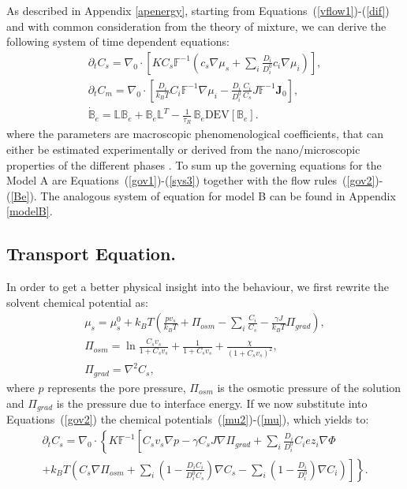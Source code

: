 \documentclass[runningheads]{llncs}
\newcommand{\F}{\ensuremath{\mathbb{F}}}
\newcommand{\LL}{\ensuremath{\mathbb{L}}}
\begin{document}
As described in Appendix \ref{apenergy}, starting from Equations~(\ref{vflow1})-(\ref{dif}) and with common consideration from the theory of mixture, we can derive the following system of time dependent equations:
\begin{eqnarray}
\partial_t C_s=\nabla_0 \cdot\left[K C_s \F^{-1}\left(c_s\nabla \mu_s +\sum_i \frac{D_i}{D^0_i} c_i \nabla \mu_i\right)\right],\label{gov2}\\
\partial_t C_m= \nabla_0\cdot\left[\frac{D_i}{k_B T}C_i\F^{-1}\nabla \mu_i -\frac{D_i}{D^0_i} \frac{C_i}{C_s} J\F^{-1} \mathbf{J}_0\right],\label{gov3} \\
\dot{\mathbb{B}}_e =\LL\mathbb{B}_e + \mathbb{B}_e \LL^T - \frac{1}{\tau_R} \,\mathbb{B}_e\text{DEV}[\mathbb{B}_e].\label{Be}
\end{eqnarray}
where the parameters are macroscopic phenomenological coefficients, that can either be estimated experimentally or derived from the nano/microscopic properties of the different phases \cite{ecm1,ecm2}. To sum up the governing equations for the Model A are Equations~(\ref{gov1})-(\ref{sys3}) together with the flow rules~(\ref{gov2})-(\ref{Be}). The analogous system of equation for model B can be found in Appendix \ref{modelB}. 

\subsection{Transport Equation.}

In order to get a better physical insight into the behaviour, we first rewrite the solvent chemical potential as:
\begin{gather}
\mu_s = \mu^0_s + k_B T \left(\frac{p v_s}{k_BT} +\Pi_{osm}-\sum_i \frac{C_i}{C_s} -\frac{\gamma J}{k_B T}\Pi_{grad}\right)\label{mu2},\\
\Pi_{osm}=\ln \frac{C_s v_s}{1+C_s v_s} + \frac{1}{1+C_sv_s}+\frac{\chi}{(1+C_s v_s)^2},\\
\Pi_{grad} = \nabla^2 C_s,
\end{gather}
where $p$ represents the pore pressure, $\Pi_{osm}$ is the osmotic pressure of the solution and $\Pi_{grad}$ is the pressure due to interface energy. If we now substitute into Equations~(\ref{gov2}) the chemical potentials~(\ref{mu2})-(\ref{mu}), which yields to:
\begin{equation}
\begin{aligned}
\partial_t C_s=\nabla_0 \cdot\left\{K\F^{-1}\left[C_s v_s\nabla p - \gamma C_s J\nabla \Pi_{grad}+\sum_i \frac{D_i}{D^0_i} C_i e z_i \nabla \Phi\right.\right.\\
\left.\left.+ k_B T \left(C_s \nabla \Pi_{osm}+ \sum_i\left(1-\frac{D_iC_i}{D^0_iC_s}\right) \nabla C_s - \sum_i\left(1-\frac{D_i}{D^0_i}\right) \nabla C_i \right)\right]\right\}.\label{long}
\end{aligned}
\end{equation}
\end{document}
